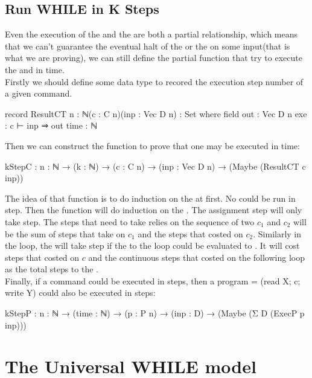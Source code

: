 \subsection{Run WHILE in K Steps}
Even the execution of the   and the   are both a partial relationship, which means that we can't guarantee the eventual halt of the  or the  on some input(that is what we are proving),
we can still define the partial function that try to execute the   and   in  time.\\
Firstly we should define some data type to recored the execution step number of a given command.
\begin{code}
record ResultCT {n : ℕ}(c : C n)(inp : Vec D n) : Set where
  field
    out  : Vec D n
    exe  : c ⊢ inp ⇒ out
    time : ℕ
\end{code}
Then we can construct the function to prove that one  may be executed in  time:
\begin{code}
kStepC : {n : ℕ} → (k : ℕ) → (c : C n) → (inp : Vec D n) 
	→ (Maybe (ResultCT c inp))
\end{code}
The idea of that function is to do induction on the  at first.
No  could be run in  step.
Then the function will do induction on the .
The assignment step will only take  step.
The steps that need to take relies on the sequence of two  $c_1$ and $c_2$ will be the sum of steps that take on $c_1$ and the steps that costed on $c_2$.
Similarly in the  loop, the  will take  step if the  to the  loop could be evaluated to .
It will cost steps that costed on $c$ and the continuous steps that costed on the following  loop as the total steps to the .\\
Finally, if a command  could be executed in  steps, then a program  = (read X; c; write Y) could also be executed in  steps:
\begin{code}
kStepP : {n : ℕ} → (time : ℕ) → (p : P n) → (inp : D) 
	→ (Maybe (Σ D (ExecP p inp)))
\end{code}

\section{The Universal WHILE model}\label{universal-I}
